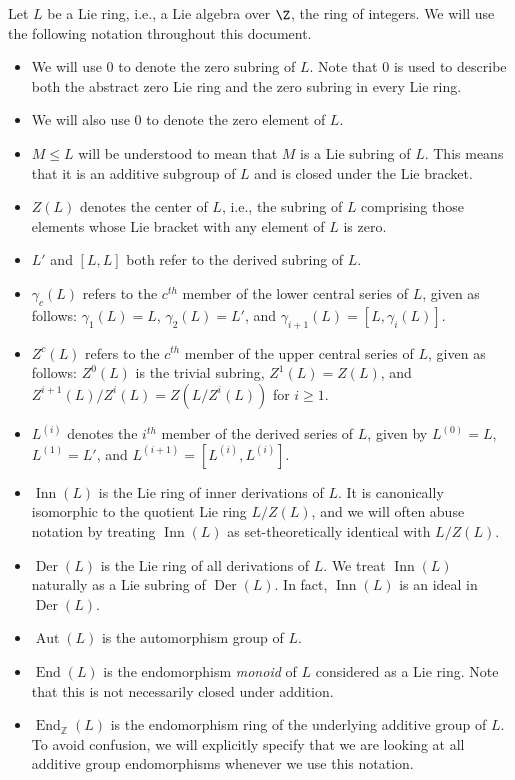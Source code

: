 \documentclass{ucetd}
\begin{document}
Let $L$ be a Lie ring, i.e., a Lie algebra over $\Z$, the ring of
integers. We will use the following notation throughout this document.

\begin{itemize}
\item We will use $0$ to denote the zero subring of $L$. Note that $0$
  is used to describe both the abstract zero Lie ring and the zero
  subring in every Lie ring.
\item We will also use $0$ to denote the zero element of $L$.
\item $M \le L$ will be understood to mean that $M$ is a Lie subring
  of $L$. This means that it is an additive subgroup of $L$ and is
  closed under the Lie bracket.
\item $Z(L)$ denotes the center of $L$, i.e., the subring of $L$
  comprising those elements whose Lie bracket with any element of $L$
  is zero.
\item $L'$ and $[L,L]$ both refer to the derived subring of $L$.
\item $\gamma_c(L)$ refers to the $c^{th}$ member of the lower central
  series of $L$, given as follows: $\gamma_1(L) = L$, $\gamma_2(L) =
  L'$, and $\gamma_{i+1}(L) = [L,\gamma_i(L)]$.
\item $Z^c(L)$ refers to the $c^{th}$ member of the upper central
  series of $L$, given as follows: $Z^0(L)$ is the trivial subring,
  $Z^1(L) = Z(L)$, and $Z^{i+1}(L)/Z^i(L) = Z(L/Z^i(L))$ for
  $i \ge 1$.
\item $L^{(i)}$ denotes the $i^{th}$ member of the derived series of
  $L$, given by $L^{(0)} = L$, $L^{(1)} = L'$, and $L^{(i+1)} =
  [L^{(i)},L^{(i)}]$.
\item $\operatorname{Inn}(L)$ is the Lie ring of inner derivations of
  $L$. It is canonically isomorphic to the quotient Lie ring $L/Z(L)$,
  and we will often abuse notation by treating $\operatorname{Inn}(L)$
  as set-theoretically identical with $L/Z(L)$.
\item $\operatorname{Der}(L)$ is the Lie ring of all derivations of
  $L$. We treat $\operatorname{Inn}(L)$ naturally as a Lie subring of
  $\operatorname{Der}(L)$. In fact, $\operatorname{Inn}(L)$ is an
  ideal in $\operatorname{Der}(L)$.
\item $\operatorname{Aut}(L)$ is the automorphism group of $L$.
\item $\operatorname{End}(L)$ is the endomorphism {\em monoid} of $L$
  considered as a Lie ring. Note that this is not necessarily closed
  under addition.
\item $\operatorname{End}_{\mathbb{Z}}(L)$ is the endomorphism ring of
  the underlying additive group of $L$. To avoid confusion, we will
  explicitly specify that we are looking at all additive group
  endomorphisms whenever we use this notation.

\end{itemize}
\end{document}
